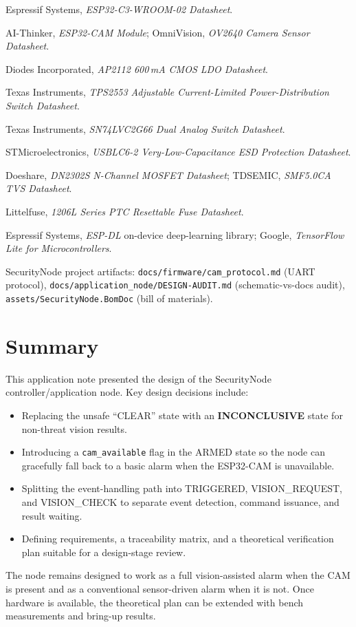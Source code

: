 \documentclass[11pt,a4paper]{article}
\begin{document}
\begin{enumerate}[label={[\arabic*]}, leftmargin=2.4em]
    \item Espressif Systems, \textit{ESP32-C3-WROOM-02 Datasheet}.
    \item AI-Thinker, \textit{ESP32-CAM Module}; OmniVision, \textit{OV2640 Camera Sensor Datasheet}.
    \item Diodes Incorporated, \textit{AP2112 600\,mA CMOS LDO Datasheet}.
    \item Texas Instruments, \textit{TPS2553 Adjustable Current-Limited Power-Distribution Switch Datasheet}.
    \item Texas Instruments, \textit{SN74LVC2G66 Dual Analog Switch Datasheet}.
    \item STMicroelectronics, \textit{USBLC6-2 Very-Low-Capacitance ESD Protection Datasheet}.
    \item Doeshare, \textit{DN2302S N-Channel MOSFET Datasheet}; TDSEMIC, \textit{SMF5.0CA TVS Datasheet}.
    \item Littelfuse, \textit{1206L Series PTC Resettable Fuse Datasheet}.
    \item Espressif Systems, \textit{ESP-DL} on-device deep-learning library; Google, \textit{TensorFlow Lite for Microcontrollers}.
    \item SecurityNode project artifacts: \texttt{docs/firmware/cam\_protocol.md} (UART protocol), \texttt{docs/application\_node/DESIGN-AUDIT.md} (schematic-vs-docs audit), \texttt{assets/SecurityNode.BomDoc} (bill of materials).
\end{enumerate}

\section{Summary}

This application note presented the design of the SecurityNode
controller/application node.  Key design decisions include:

\begin{itemize}
    \item Replacing the unsafe ``CLEAR'' state with an \textbf{INCONCLUSIVE} state for non-threat vision results.
    \item Introducing a \texttt{cam\_available} flag in the ARMED state so the node can gracefully fall back to a basic alarm when the ESP32-CAM is unavailable.
    \item Splitting the event-handling path into TRIGGERED, VISION\_REQUEST, and VISION\_CHECK to separate event detection, command issuance, and result waiting.
    \item Defining requirements, a traceability matrix, and a theoretical verification plan suitable for a design-stage review.
\end{itemize}

The node remains designed to work as a full vision-assisted alarm when the CAM
is present and as a conventional sensor-driven alarm when it is not.  Once
hardware is available, the theoretical plan can be extended with bench
measurements and bring-up results.
\end{document}
